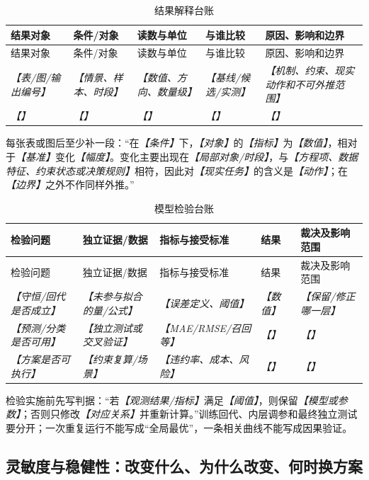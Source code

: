 \documentclass[UTF8,zihao=-4]{ctexart}
\newcommand{\slot}[1]{\textcolor{inkblue}{\textit{【#1】}}}
\begin{document}
\begin{longtable}{p{2.2cm}p{3.0cm}p{3.0cm}p{3.0cm}p{3.5cm}}
\caption{结果解释台账}\label{tab:template-result-ledger}\\
\toprule
结果对象 & 条件/对象 & 读数与单位 & 与谁比较 & 原因、影响和边界\\
\midrule
\endfirsthead
\toprule
结果对象 & 条件/对象 & 读数与单位 & 与谁比较 & 原因、影响和边界\\
\midrule
\endhead
\slot{表/图/输出编号} & \slot{情景、样本、时段} & \slot{数值、方向、数量级} & \slot{基线/候选/实测} & \slot{机制、约束、现实动作和不可外推范围}\\
\slot{} & \slot{} & \slot{} & \slot{} & \slot{}\\
\bottomrule
\end{longtable}

每张表或图后至少补一段：“在\slot{条件}下，\slot{对象}的\slot{指标}为\slot{数值}，相对于\slot{基准}变化\slot{幅度}。变化主要出现在\slot{局部对象/时段}，与\slot{方程项、数据特征、约束状态或决策规则}相符，因此对\slot{现实任务}的含义是\slot{动作}；在\slot{边界}之外不作同样外推。”

\begin{longtable}{p{2.6cm}p{3.4cm}p{3.0cm}p{3.0cm}p{2.8cm}}
\caption{模型检验台账}\label{tab:template-validation-ledger}\\
\toprule
检验问题 & 独立证据/数据 & 指标与接受标准 & 结果 & 裁决及影响范围\\
\midrule
\endfirsthead
\toprule
检验问题 & 独立证据/数据 & 指标与接受标准 & 结果 & 裁决及影响范围\\
\midrule
\endhead
\slot{守恒/回代是否成立} & \slot{未参与拟合的量/公式} & \slot{误差定义、阈值} & \slot{数值} & \slot{保留/修正哪一层}\\
\slot{预测/分类是否可用} & \slot{独立测试或交叉验证} & \slot{MAE/RMSE/召回等} & \slot{} & \slot{}\\
\slot{方案是否可执行} & \slot{约束复算/场景} & \slot{违约率、成本、风险} & \slot{} & \slot{}\\
\bottomrule
\end{longtable}

检验实施前先写判据：“若\slot{观测结果/指标}满足\slot{阈值}，则保留\slot{模型或参数}；否则只修改\slot{对应关系}并重新计算。”训练回代、内层调参和最终独立测试要分开；一次重复运行不能写成“全局最优”，一条相关曲线不能写成因果验证。

\subsection{灵敏度与稳健性：改变什么、为什么改变、何时换方案}
\end{document}
